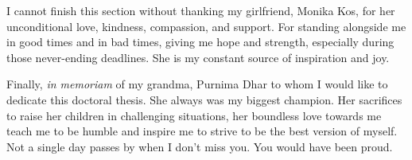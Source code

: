 I cannot finish this section without thanking my girlfriend, Monika Kos, for her unconditional love, kindness, compassion, and support. For standing alongside me in good times and in bad times, giving me hope and strength, especially during those never-ending deadlines. She is my constant source of inspiration and joy.

\vspace{1cm}
Finally, \emph{in memoriam} of my grandma, Purnima Dhar to whom I would like to dedicate this doctoral thesis. She always was my biggest champion. Her sacrifices to raise her children in challenging situations, her boundless love towards me teach me to be humble and inspire me to strive to be the best version of myself. Not a single day passes by when I don't miss you. You would have been proud.


\endgroup
